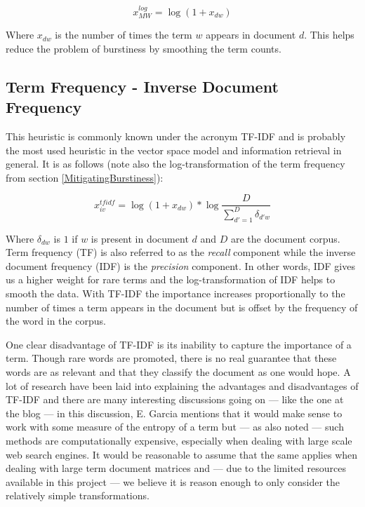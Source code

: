 \[
x_{MW}^{log} = \log{(1 + x_{dw})}
\]

Where $x_{dw}$ is the number of times the term $w$ appears in document
$d$. This helps reduce the problem of burstiness by smoothing
 the term counts.

\subsection{Term Frequency - Inverse Document Frequency\label{TFIDF}}

This heuristic is commonly known under the acronym TF-IDF and is
probably the most used heuristic in the vector space model and
information retrieval in general. It is as follows (note also the
log-transformation of the term frequency from
section \ref{MitigatingBurstiness}):

\[
x_{iv}^{tfidf} = \log{(1 + x_{dw})} * \log{\frac{D}{\sum_{d\prime = 1}^{D}\delta_{d\prime w}} }
\]

Where $\delta_{dw}$ is $1$ if $w$ is present in document $d$ and $D$
are the document corpus. Term frequency (TF) is also referred to as the
\textit{recall} component while the inverse document frequency (IDF)
is the \textit{precision} component. In other words, IDF gives us a
higher weight for rare terms and the log-transformation of IDF helps
to smooth  the data. With TF-IDF the importance increases
proportionally to the number of times a term appears in the document
but is offset by the frequency of the word in the corpus.

One clear disadvantage of TF-IDF is its inability to capture the
importance of a term. Though rare words are promoted, there is no real
guarantee that these words are as relevant and that they classify the
document as one would hope. A lot of research have been laid into
explaining the advantages and disadvantages of TF-IDF and there are
many interesting discussions going on --- like the one at the blog
\cite{UnderstandingTFIDF} --- in this discussion, E. Garcia mentions
that it would make sense to work with some measure of the entropy of a
term but --- as also noted --- such methods are computationally
expensive, especially when dealing with large scale web search
engines. It would be reasonable to assume that the same applies when
dealing with large term document matrices and --- due to the limited
resources available in this project --- we believe it is reason enough
to only consider the relatively simple transformations.

